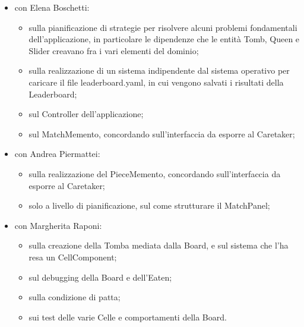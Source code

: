 \documentclass[a4paper,12pt]{report}
\begin{document}
\begin{itemize}
	
	\item con Elena Boschetti:
	
	\begin{itemize}
		
		\item sulla pianificazione di strategie per risolvere alcuni problemi fondamentali dell'applicazione, in particolare le dipendenze che le entità Tomb, Queen e Slider creavano fra i vari elementi del dominio;
		
		\item sulla realizzazione di un sistema indipendente dal sistema operativo per caricare il file leaderboard.yaml, in cui vengono salvati i risultati della Leaderboard;
		
		\item sul Controller dell'applicazione;
		
		\item sul MatchMemento, concordando sull'interfaccia da esporre al Caretaker;
				
	\end{itemize}

	\item con Andrea Piermattei:
	
	\begin{itemize}
		
		\item sulla realizzazione del PieceMemento, concordando sull'interfaccia da esporre al Caretaker;
		
		\item solo a livello di pianificazione, sul come strutturare il MatchPanel;
		
	\end{itemize}

	\item con Margherita Raponi:
	
	\begin{itemize}
		
		\item sulla creazione della Tomba mediata dalla Board, e sul sistema che l'ha resa un CellComponent;
		
		\item sul debugging della Board e dell'Eaten;
		
		\item sulla condizione di patta;
		
		\item sui test delle varie Celle e comportamenti della Board.
		
	\end{itemize}

\end{itemize}
\end{document}

